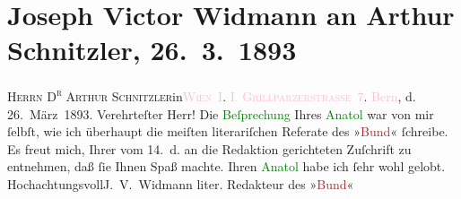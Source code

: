 

               \section[Joseph Victor Widmann an Arthur Schnitzler, 26. 3. 1893]{ Joseph Victor Widmann an Arthur Schnitzler,
                    26. 3. 1893}\nopagebreak{}\rehead{ }\normalsize\beginnumbering{} \toendnotes[C]{\smallbreak\pagebreak[2]} 
\toendnotes[C]{\smallbreak}\pstart{}{\pb}\textsc{Herrn
                                D\textsuperscript{r} Arthur Schnitzler}\pend{}\pstart{}in\pend{}\pstart{}\textcolor{pink}{\textsc{Wien} I}{}\ledrightnote{\textcolor{pink}{I., Innere Stadt}}. \pend{}\pstart{}\textsc{\textcolor{pink}{I.
                                Grillparzerstraſse 7}{}\ledrightnote{\textcolor{pink}{Grillparzerstraße}}.}\pend{}{\bigskip}\pstart
           \raggedleft{}{\pb}\textcolor{pink}{Bern}{}\ledrightnote{\textcolor{pink}{Bern}}, d.
                            26. März 1893.\pend
           \pstart{}Verehrteſter Herr!\pend\pstart
           Die \textcolor{green}{Beſprechung}{} Ihres \textcolor{green}{Anatol}{}\ledrightnote{\textcolor{green}{Anatol}} war von mir ſelbſt, wie ich überhaupt die meiſten
                    literariſchen Referate des »\textcolor{brown}{Bund}{}\ledrightnote{\textcolor{brown}{Der Bund}}« ſchreibe. Es
                    freut mich, Ihrer vom 14. d. an die Redaktion gerichteten Zuſchrift zu
                    entnehmen, daß ſie Ihnen Spaß machte.  Ihren
                        \textcolor{green}{Anatol}{}\ledrightnote{\textcolor{green}{Anatol}} habe ich ſehr wohl gelobt.\pend
           \pstart Hochachtungsvoll\spacefill\mbox{J. V. Widmann}\pend{}\pstart
           \raggedleft{}liter. Redakteur des »\textcolor{brown}{Bund}{}\ledrightnote{\textcolor{brown}{Der Bund}}«\pend
           \endnumbering{}  
      